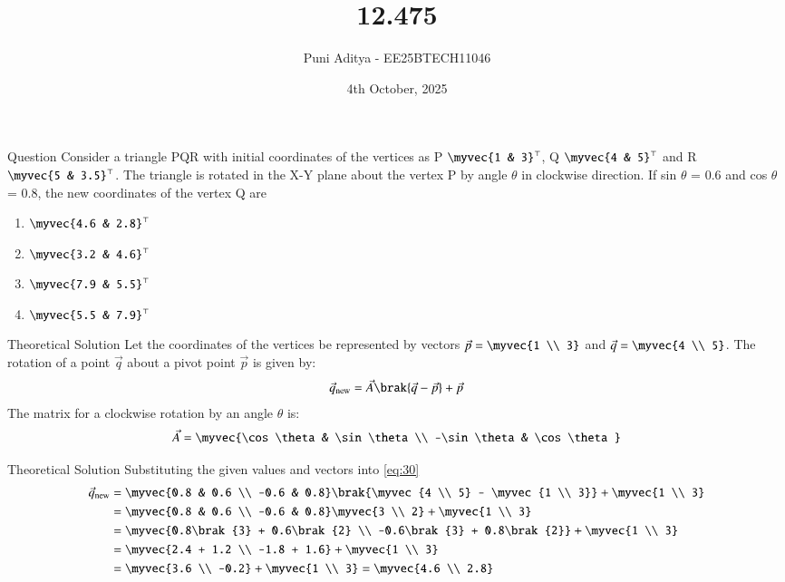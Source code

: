 \documentclass{beamer}
\title{12.475}
\date{4th October, 2025}
\author{Puni Aditya - EE25BTECH11046}
\begin{document}
\frame{\titlepage}
\begin{frame}{Question}
Consider a triangle PQR with initial coordinates of the vertices as P $\myvec{1 & 3}^\top$, Q $\myvec{4 & 5}^\top$ and R $\myvec{5 & 3.5}^\top$. The triangle is rotated in the X-Y plane about the vertex P by angle $\theta$ in clockwise direction. If sin $\theta$ = 0.6 and cos $\theta$ = 0.8, the new coordinates of the vertex Q are
\begin{enumerate}
    \item $\myvec{4.6 & 2.8}^\top$
    \item $\myvec{3.2 & 4.6}^\top$
    \item $\myvec{7.9 & 5.5}^\top$
    \item $\myvec{5.5 & 7.9}^\top$
\end{enumerate}
\end{frame}

\begin{frame}{Theoretical Solution}
Let the coordinates of the vertices be represented by vectors $\vec{p} = \myvec{1 \\ 3}$ and $\vec{q} = \myvec{4 \\ 5}$.
The rotation of a point $\vec{q}$ about a pivot point $\vec{p}$ is given by:
\begin{align}
    \vec{q}_{\text{new}} = \vec{A}\brak{\vec{q} - \vec{p}} + \vec{p} \label{eq:30}
\end{align}
The matrix for a clockwise rotation by an angle $\theta$ is:
\begin{align}
    \vec{A} = \myvec{\cos\theta & \sin\theta \\ -\sin\theta & \cos\theta}
\end{align}
\end{frame}

\begin{frame}{Theoretical Solution}
Substituting the given values and vectors into \eqref{eq:30}
\begin{align}
    \vec{q}_{\text{new}} &= \myvec{0.8 & 0.6 \\ -0.6 & 0.8}\brak{\myvec{4 \\ 5} - \myvec{1 \\ 3}} + \myvec{1 \\ 3}  \\
    &= \myvec{0.8 & 0.6 \\ -0.6 & 0.8}\myvec{3 \\ 2} + \myvec{1 \\ 3}  \\
    &= \myvec{0.8\brak{3} + 0.6\brak{2} \\ -0.6\brak{3} + 0.8\brak{2}} + \myvec{1 \\ 3}  \\
    &= \myvec{2.4 + 1.2 \\ -1.8 + 1.6} + \myvec{1 \\ 3}  \\
    &= \myvec{3.6 \\ -0.2} + \myvec{1 \\ 3} = \myvec{4.6 \\ 2.8}
\end{align}
\end{frame}
\end{document}
